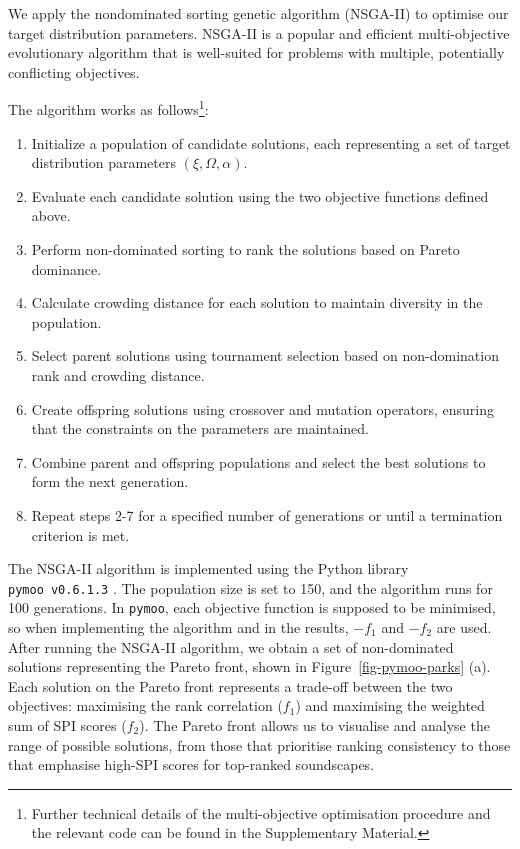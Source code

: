 \documentclass[
  authoryear,
  3p]{elsarticle}
\providecommand{\tightlist}{%
  \setlength{\itemsep}{0pt}\setlength{\parskip}{0pt}}\usepackage{longtable,booktabs,array}
\begin{document}
We apply the nondominated sorting genetic algorithm (NSGA-II)
\citep{Deb2002fast} to optimise our target distribution parameters.
NSGA-II is a popular and efficient multi-objective evolutionary
algorithm that is well-suited for problems with multiple, potentially
conflicting objectives.

The algorithm works as follows\footnote{Further technical details of the
  multi-objective optimisation procedure and the relevant code can be
  found in the Supplementary Material.}:

\begin{enumerate}
\def\labelenumi{\arabic{enumi}.}
\tightlist
\item
  Initialize a population of candidate solutions, each representing a
  set of target distribution parameters \((\xi, \Omega, \alpha)\).
\item
  Evaluate each candidate solution using the two objective functions
  defined above.
\item
  Perform non-dominated sorting to rank the solutions based on Pareto
  dominance.
\item
  Calculate crowding distance for each solution to maintain diversity in
  the population.
\item
  Select parent solutions using tournament selection based on
  non-domination rank and crowding distance.
\item
  Create offspring solutions using crossover and mutation operators,
  ensuring that the constraints on the parameters are maintained.
\item
  Combine parent and offspring populations and select the best solutions
  to form the next generation.
\item
  Repeat steps 2-7 for a specified number of generations or until a
  termination criterion is met.
\end{enumerate}

The NSGA-II algorithm is implemented using the Python library
\texttt{pymoo\ v0.6.1.3} \citep{pymoo}. The population size is set to
150, and the algorithm runs for 100 generations. In \texttt{pymoo}, each
objective function is supposed to be minimised, so when implementing the
algorithm and in the results, \(-f_1\) and \(-f_2\) are used. After
running the NSGA-II algorithm, we obtain a set of non-dominated
solutions representing the Pareto front, shown in
Figure~\ref{fig-pymoo-parks} (a). Each solution on the Pareto front
represents a trade-off between the two objectives: maximising the rank
correlation (\(f_1\)) and maximising the weighted sum of SPI scores
(\(f_2\)). The Pareto front allows us to visualise and analyse the range
of possible solutions, from those that prioritise ranking consistency to
those that emphasise high-SPI scores for top-ranked soundscapes.
\end{document}
